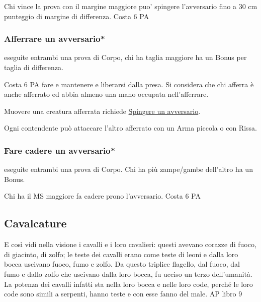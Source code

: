 \documentclass[12pt,a4paper,twoside,openany]{book}
\begin{document}
\begin{multicols}{2}
Chi vince la prova con il margine maggiore puo' spingere l'avversario fino a 30 cm punteggio di margine di differenza. Costa 6 PA

\subsubsection{Afferrare un avversario*}\label{afferrareunavversario}

eseguite entrambi una prova di Corpo, chi ha taglia maggiore ha un Bonus per taglia di differenza.

Costa 6 PA fare e mantenere e liberarsi dalla presa. Si considera che chi afferra è anche afferrato ed abbia almeno una mano occupata nell'afferrare.

Muovere una creatura afferrata richiede \hyperlink{spingereavversario}{Spingere un avversario}.

Ogni contendente può attaccare l'altro afferrato con un Arma piccola o con Rissa.

\subsubsection{Fare cadere un avversario*} \label{farecadereavversario}

eseguite entrambi una prova di Corpo. Chi ha più zampe/gambe dell'altro ha un Bonus.

Chi ha il MS maggiore fa cadere prono l'avversario. Costa 6 PA

\subsection{Cavalcature}\label{cavalcature}

\begin{changemargin}{0.3cm}{0.3cm}\begin{enfasi}{
E così vidi nella visione i cavalli e i loro cavalieri: questi avevano corazze di fuoco, di giacinto, di zolfo; le teste dei cavalli erano come teste di leoni e dalla loro bocca uscivano fuoco, fumo e zolfo. Da questo triplice flagello, dal fuoco, dal fumo e dallo zolfo che uscivano dalla loro bocca, fu ucciso un terzo dell’umanità. La potenza dei cavalli infatti sta nella loro bocca e nelle loro code, perché le loro code sono simili a serpenti, hanno teste e con esse fanno del male. AP libro 9}\end{enfasi}\end{changemargin}\medskip


\end{multicols}
\end{document}
